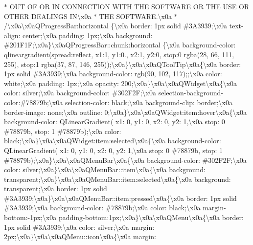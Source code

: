 $\ast$ O\+U\+T O\+F O\+R I\+N C\+O\+N\+N\+E\+C\+T\+I\+O\+N W\+I\+T\+H T\+H\+E S\+O\+F\+T\+W\+A\+R\+E O\+R T\+H\+E U\+S\+E O\+R O\+T\+H\+E\+R D\+E\+A\+L\+I\+N\+G\+S I\+N\textbackslash{}x0a $\ast$ T\+H\+E S\+O\+F\+T\+W\+A\+R\+E.\textbackslash{}x0a $\ast$/\textbackslash{}x0a\textbackslash{}x0a\+Q\+Progress\+Bar\+:horizontal \{\textbackslash{}x0a border\+: 1px solid \#3\+A3939;\textbackslash{}x0a text-\/align\+: center;\textbackslash{}x0a padding\+: 1px;\textbackslash{}x0a background\+: \#201\+F1\+F;\textbackslash{}x0a\}\textbackslash{}x0a\+Q\+Progress\+Bar\+::chunk\+:horizontal \{\textbackslash{}x0a background-\/color\+: qlineargradient(spread\+:reflect, x1\+:1, y1\+:0., x2\+:1, y2\+:0, stop\+:0 rgba(28, 66, 111, 255), stop\+:1 rgba(37, 87, 146, 255));\textbackslash{}x0a\}\textbackslash{}x0a\textbackslash{}x0a\+Q\+Tool\+Tip\textbackslash{}x0a\{\textbackslash{}x0a border\+: 1px solid \#3\+A3939;\textbackslash{}x0a background-\/color\+: rgb(90, 102, 117);;\textbackslash{}x0a color\+: white;\textbackslash{}x0a padding\+: 1px;\textbackslash{}x0a opacity\+: 200;\textbackslash{}x0a\}\textbackslash{}x0a\textbackslash{}x0a\+Q\+Widget\textbackslash{}x0a\{\textbackslash{}x0a color\+: silver;\textbackslash{}x0a background-\/color\+: \#302\+F2\+F;\textbackslash{}x0a selection-\/background-\/color\+:\#78879b;\textbackslash{}x0a selection-\/color\+: black;\textbackslash{}x0a background-\/clip\+: border;\textbackslash{}x0a border-\/image\+: none;\textbackslash{}x0a outline\+: 0;\textbackslash{}x0a\}\textbackslash{}x0a\textbackslash{}x0a\+Q\+Widget\+:item\+:hover\textbackslash{}x0a\{\textbackslash{}x0a background-\/color\+: Q\+Linear\+Gradient( x1\+: 0, y1\+: 0, x2\+: 0, y2\+: 1,\textbackslash{}x0a stop\+: 0 \#78879b, stop\+: 1 \#78879b);\textbackslash{}x0a color\+: black;\textbackslash{}x0a\}\textbackslash{}x0a\textbackslash{}x0a\+Q\+Widget\+:item\+:selected\textbackslash{}x0a\{\textbackslash{}x0a background-\/color\+: Q\+Linear\+Gradient( x1\+: 0, y1\+: 0, x2\+: 0, y2\+: 1,\textbackslash{}x0a stop\+: 0 \#78879b, stop\+: 1 \#78879b);\textbackslash{}x0a\}\textbackslash{}x0a\textbackslash{}x0a\+Q\+Menu\+Bar\textbackslash{}x0a\{\textbackslash{}x0a background-\/color\+: \#302\+F2\+F;\textbackslash{}x0a color\+: silver;\textbackslash{}x0a\}\textbackslash{}x0a\textbackslash{}x0a\+Q\+Menu\+Bar\+::item\textbackslash{}x0a\{\textbackslash{}x0a background\+: transparent;\textbackslash{}x0a\}\textbackslash{}x0a\textbackslash{}x0a\+Q\+Menu\+Bar\+::item\+:selected\textbackslash{}x0a\{\textbackslash{}x0a background\+: transparent;\textbackslash{}x0a border\+: 1px solid \#3\+A3939;\textbackslash{}x0a\}\textbackslash{}x0a\textbackslash{}x0a\+Q\+Menu\+Bar\+::item\+:pressed\textbackslash{}x0a\{\textbackslash{}x0a border\+: 1px solid \#3\+A3939;\textbackslash{}x0a background-\/color\+: \#78879b;\textbackslash{}x0a color\+: black;\textbackslash{}x0a margin-\/bottom\+:-\/1px;\textbackslash{}x0a padding-\/bottom\+:1px;\textbackslash{}x0a\}\textbackslash{}x0a\textbackslash{}x0a\+Q\+Menu\textbackslash{}x0a\{\textbackslash{}x0a border\+: 1px solid \#3\+A3939;\textbackslash{}x0a color\+: silver;\textbackslash{}x0a margin\+: 2px;\textbackslash{}x0a\}\textbackslash{}x0a\textbackslash{}x0a\+Q\+Menu\+::icon\textbackslash{}x0a\{\textbackslash{}x0a margin\+: 
